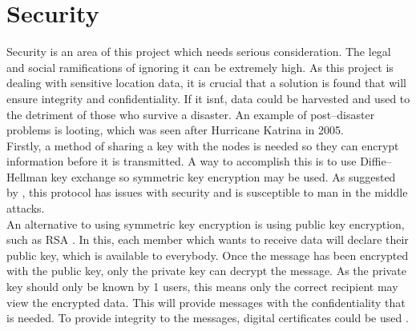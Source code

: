 \documentclass{report}
\begin{document}
\section{Security}

Security is an area of this project which needs serious consideration. The legal and social ramifications \cite{bbcData} of ignoring it can be extremely high. As this project is dealing with sensitive location data, it is crucial that a solution is found that will ensure integrity and confidentiality. If it isn\'t, data could be harvested and used to the detriment of those who survive a disaster. An example of post--disaster problems is looting, which was seen after Hurricane Katrina in 2005\cite{nbcKatrina}.
\bigskip\\
Firstly, a method of sharing a key with the nodes is needed so they can encrypt information before it is transmitted. A way to accomplish this is to use Diffie--Hellman key exchange\cite{diffie1976new} so symmetric key encryption may be used. As suggested by \cite{li2010research}, this protocol has issues with security and is susceptible to man in the middle attacks. 
\bigskip\\
An alternative to using symmetric key encryption is using public key encryption, such as RSA \cite{aufa2018security}. In this, each member which wants to receive data will declare their public key, which is available to everybody. Once the message has been encrypted with the public key, only the private key can decrypt the message. As the private key should only be known by 1 users, this means only the correct recipient may view the encrypted data. This will provide messages with the confidentiality that is needed. 
To provide integrity to the messages, digital certificates could be used \cite{diffie1976new}. 
\end{document}
